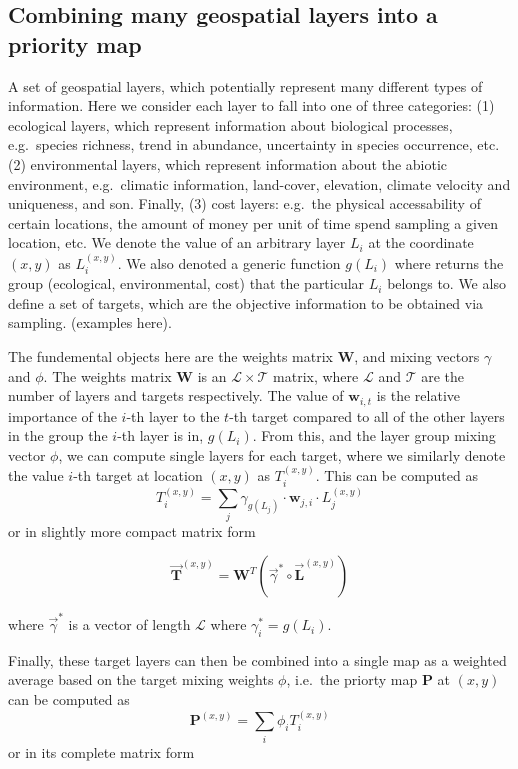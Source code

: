 \documentclass[11pt]{article}
\begin{document}
\hypertarget{combining-many-geospatial-layers-into-a-priority-map}{%
\subsection{Combining many geospatial layers into a priority
map}\label{combining-many-geospatial-layers-into-a-priority-map}}

A set of geospatial layers, which potentially represent many different
types of information. Here we consider each layer to fall into one of
three categories: (1) ecological layers, which represent information
about biological processes, e.g.~species richness, trend in abundance,
uncertainty in species occurrence, etc. (2) environmental layers, which
represent information about the abiotic environment, e.g.~climatic
information, land-cover, elevation, climate velocity and uniqueness, and
son. Finally, (3) cost layers: e.g.~the physical accessability of
certain locations, the amount of money per unit of time spend sampling a
given location, etc. We denote the value of an arbitrary layer \(L_i\)
at the coordinate \((x,y)\) as \(L_i^{(x,y)}\). We also denoted a
generic function \(g(L_i)\) where returns the group (ecological,
environmental, cost) that the particular \(L_i\) belongs to. We also
define a set of targets, which are the objective information to be
obtained via sampling. (examples here).

The fundemental objects here are the weights matrix \(\mathbf{W}\), and
mixing vectors \(\gamma\) and \(\phi\). The weights matrix
\(\mathbf{W}\) is an \(\mathcal{L} \times \mathcal{T}\) matrix, where
\(\mathcal{L}\) and \(\mathcal{T}\) are the number of layers and targets
respectively. The value of \(\mathbf{w}_{i,t}\) is the relative
importance of the \(i\)-th layer to the \(t\)-th target compared to all
of the other layers in the group the \(i\)-th layer is in, \(g(L_i)\).
From this, and the layer group mixing vector \(\phi\), we can compute
single layers for each target, where we similarly denote the value
\(i\)-th target at location \((x,y)\) as \(T_i^{(x,y)}\). This can be
computed as \[T_i^{(x,y)} = \sum_j \gamma_{g(L_j)}
\cdot \mathbf{w}_{j,i} \cdot L_j^{(x,y)}\]or in slightly more compact
matrix form

\[\vec{\mathbf{T}}^{(x,y)} = \mathbf{W}^T(\vec{\gamma}^* \circ \vec{\mathbf{L}}^{(x,y)})\]

where \(\vec{\gamma}^*\) is a vector of length \(\mathcal{L}\) where
\(\gamma_i^* = g(L_i)\).

Finally, these target layers can then be combined into a single map as a
weighted average based on the target mixing weights \(\phi\), i.e.~the
priorty map \(\mathbf{P}\) at \((x,y)\) can be computed as
\[\mathbf{P}^{(x,y)} = \sum_i \phi_i
T_i^{(x,y)}\] or in its complete matrix form
\end{document}
